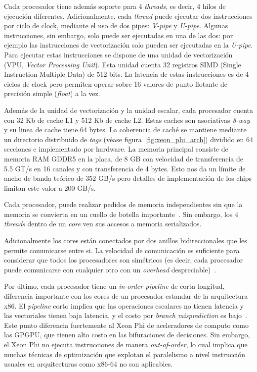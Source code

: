 Cada procesador tiene adem\'as soporte para 4 \textit{threads}, es decir, 4 hilos de ejecuci\'on diferentes. Adicionalmente,
cada \textit{thread} puede ejecutar dos instrucciones por ciclo de clock, mediante el uso de dos pipes: \textit{V-pipe} y \textit{U-pipe}.
Algunas instrucciones, sin embargo, solo puede ser ejecutadas en una de las dos: por ejemplo las instrucciones de vectorizaci\'on solo pueden
ser ejecutadas en la \textit{U-pipe}. Para ejecutar estas instrucciones se dispone de una unidad de vectorizaci\'on (VPU, \textit{Vector Processing Unit}).
Esta unidad cuenta 32 registros SIMD (Single Instruction Multiple Data) de 512 bits. La latencia de estas instrucciones es de 4 ciclos de clock pero permiten
operar sobre 16 valores de punto flotante de precisi\'on simple (\textit{float}) a la vez.

Adem\'as de la unidad de vectorizaci\'on y la unidad escalar, cada procesador cuenta con 32 Kb de cache L1 y 512 Kb de cache
L2. Estas caches son asociativas \textit{8-way} y su linea de cache tiene 64 bytes. La coherencia de cach\'e se mantiene
mediante un directorio distribuido de \textit{tags} (v\'ease figura~\ref{fig:xeon_phi_arch}) dividido en 64 secciones e implementado
por hardware. La memoria principal consiste de memoria RAM GDDR5 en la placa, de 8 GB con velocidad de transferencia de 5.5 GT/s en 16 canales y con transferencia de 4
bytes. Esto nos da un l\'imite de ancho de banda te\'orico de 352 GB/s pero detalles de implementaci\'on de los chips limitan este valor a 200 GB/s.

Cada procesador, puede realizar pedidos de memoria independientes sin que la memoria se convierta en un cuello
de botella importante~\cite{Fang}. Sin embargo, los 4 \textit{threads} dentro de un \textit{core} ven sus accesos a memoria serializados.

Adicionalmente los cores est\'an conectados por dos anillos bidireccionales que les permite comunicarse entre si. La velocidad de
comunicaci\'on es suficiente para considerar que todos los procesadores son sim\'etricos (es decir, cada procesador puede comunicarse con
cualquier otro con un \textit{overhead} despreciable)~\cite{Fang}.

Por \'ultimo, cada procesador tiene un \textit{in-order pipeline} de corta longitud, diferencia importante con los cores de un procesador
estandar de la arquitectura x86. El \textit{pipeline} corto implica que las operaciones escalares no tienen latencia y las vectoriales tienen baja latencia,
y el costo por \textit{branch misprediction} es bajo~\cite{IntelXeonPhiWhitePaper}. Este punto diferencia fuertemente al Xeon Phi de aceleradores de computo como las GPGPU,
que tienen alto costo en las bifuraciones de decisiones. Sin embargo, el Xeon Phi no ejecuta instrucciones de manera \textit{out-of-order}, lo cual implica que muchas
t\'ecnicas de optimizaci\'on que explotan el paralelismo a nivel instrucci\'on usuales en arquitecturas como x86-64 no son aplicables.

